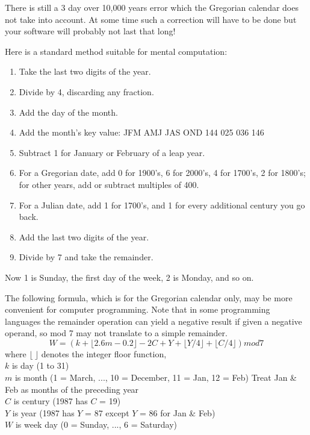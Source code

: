     There is still a 3 day over 10,000 years error which the Gregorian calendar
    does not take into account.  At some time such a correction will have
    to be done but your software will probably not last that long!

    Here is a standard method suitable for mental computation:


\begin{enumerate}
        \item Take the last two digits of the year.
        \item Divide by 4, discarding any fraction.
        \item Add the day of the month.
        \item Add the month's key value: JFM AMJ JAS OND
                                         144 025 036 146
        \item Subtract 1 for January or February of a leap year.
        \item For a Gregorian date, add 0 for 1900's, 6 for 2000's,
             4 for 1700's,
           2 for 1800's; for other years, add or subtract multiples of 400.
        \item For a Julian date, add 1 for 1700's, and 1 for every additional
           century you go back.
        \item Add the last two digits of the year.
        \item Divide by 7 and take the remainder.
\end{enumerate}

        Now 1 is Sunday, the first day of the week, 2 is Monday, and so on.

    The following formula, which is for the Gregorian calendar only, may be
    more convenient for computer programming.  Note that in some programming
    languages the remainder operation can yield a negative result if given
    a negative operand, so mod 7 may not translate to a simple remainder.
       \[ W = (k + \lfloor 2.6m - 0.2\rfloor - 2C + Y + \lfloor Y/4
\rfloor + \lfloor C/4\rfloor) mod 7 \]
           where $\lfloor\ \rfloor$  denotes the integer floor function,\\
           $k$ is day (1 to 31)\\
           $m$ is month (1 = March, ..., 10 = December, 11 = Jan, 12 = Feb)
                         Treat Jan \& Feb as months of the preceding year\\
           $C$ is century (1987 has $C$ = 19)\\
           $Y$ is year    (1987 has $Y$ = 87 except $Y$ = 86 for Jan \& Feb)\\
           $W$ is week day (0 = Sunday, ..., 6 = Saturday)\\

